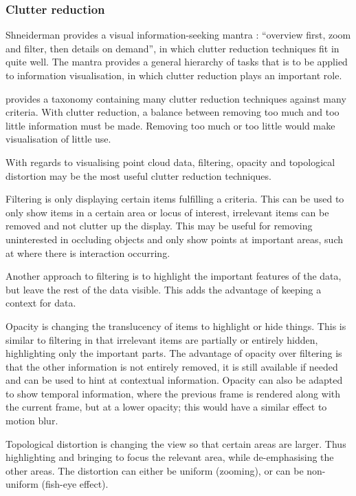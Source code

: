 
\subsubsection*{Clutter reduction}
\label{ssub:clutter_reduction}

Shneiderman provides a visual information-seeking mantra \citep{shneiderman96}:
``overview first, zoom and filter, then details on demand'', in which clutter
reduction techniques fit in quite well. The mantra provides a general hierarchy
of tasks that is to be applied to information visualisation, in which clutter
reduction plays an important role.

\citet{ellis07} provides a taxonomy containing many clutter reduction techniques
against many criteria. With clutter reduction, a balance between removing too
much and too little information must be made. Removing too much or too little
would make visualisation of little use.

With regards to visualising point cloud data, filtering, opacity and topological
distortion may be the most useful clutter reduction techniques.

Filtering is only displaying certain items fulfilling a criteria. This can be
used to only show items in a certain area or locus of interest, irrelevant items
can be removed and not clutter up the display. This may be useful for removing
uninterested in occluding objects and only show points at important areas, such
at where there is interaction occurring.

Another approach to filtering is to highlight the important features of the
data, but leave the rest of the data visible. This adds the advantage of
keeping a context for data.

Opacity is changing the translucency of items to highlight or hide things. This
is similar to filtering in that irrelevant items are partially or entirely
hidden, highlighting only the important parts. The advantage of opacity over
filtering is that the other information is not entirely removed, it is still
available if needed and can be used to hint at contextual information. Opacity
can also be adapted to show temporal information, where the previous frame is
rendered along with the current frame, but at a lower opacity; this would have a
similar effect to motion blur.

Topological distortion is changing the view so that certain areas are larger.
Thus highlighting and bringing to focus the relevant area, while de-emphasising
the other areas. The distortion can either be uniform (zooming), or can be
non-uniform (fish-eye effect).

